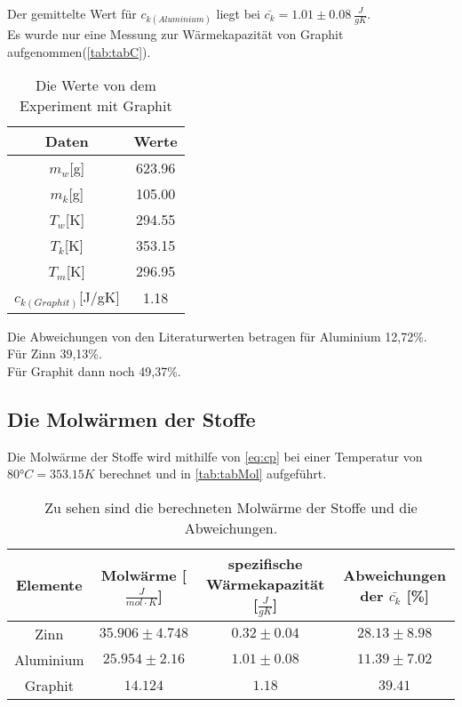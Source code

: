 Der gemittelte Wert für $c_{k(Aluminium)}$ liegt bei $\bar{c_k} = 1.01\pm 0.08\ \frac{J}{gK}$.\\
\newline
Es wurde nur eine Messung zur Wärmekapazität von Graphit aufgenommen(\autoref{tab:tabC}).
  \begin{table}[htp]
    \centering
    \caption{Die Werte von dem Experiment mit Graphit}
    \label{tab:tabC}
    \begin{tabular}{c c}
      \toprule
      Daten & Werte\\
      \midrule
            \(m_w\)[g] & 623.96\\
            \(m_k\)[g] & 105.00\\
            \(T_w\)[K] & 294.55\\
            \(T_k\)[K] & 353.15\\
            \(T_m\)[K] & 296.95\\
      \bottomrule
            \(c_{k(Graphit)}\)[J/gK] & 1.18\\
    \end{tabular}
  \end{table}
\newpage
Die Abweichungen von den Literaturwerten betragen für Aluminium 12,72\%.\\
Für Zinn 39,13\%.\\
Für Graphit dann noch 49,37\%.

\subsection{Die Molwärmen der Stoffe}

Die Molwärme der Stoffe wird mithilfe von \autoref{eq:cp} bei einer Temperatur von $80°C = 353.15K$ berechnet und in \autoref{tab:tabMol} aufgeführt.

\begin{table}[htbp]
    \centering
    \caption{Zu sehen sind die berechneten Molwärme der Stoffe und die Abweichungen.\cite{warm}}
    \label{tab:tabMol}
    \begin{tabular}{c c c c}
        \toprule
        Elemente & Molwärme [$\frac{J}{mol\cdot K}$]& spezifische Wärmekapazität [$\frac{J}{gK}$] & Abweichungen der $\bar{c_k}$ [\%]\\
        \midrule
        Zinn & $35.906\pm 4.748$ & $0.32\pm 0.04$ & $28.13\pm 8.98$\\
        Aluminium & $25.954\pm 2.16$ & $1.01\pm 0.08$ & $11.39\pm 7.02$\\
        Graphit & $14.124$ & $1.18$ & $39.41$\\
        \bottomrule
    \end{tabular}
\end{table}